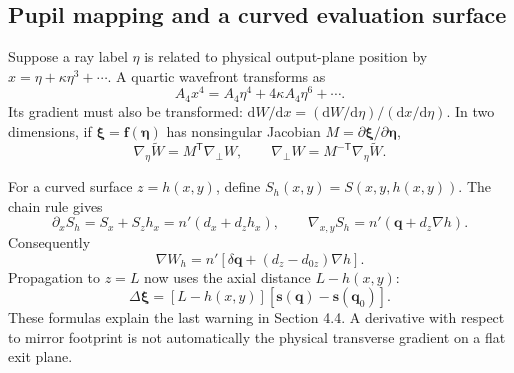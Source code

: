 \documentclass[11pt,a4paper]{article}
\numberwithin{equation}{section}
\newcommand{\dd}{\mathrm{d}}
\newcommand{\gradp}{\nabla_{\!\perp}}
\newcommand{\vct}[1]{\bm{#1}}
\begin{document}
\subsection{Pupil mapping and a curved evaluation surface}
Suppose a ray label $\eta$ is related to physical output-plane position by
$x=\eta+\kappa\eta^3+\cdots$. A quartic wavefront transforms as
\[
 A_4x^4=A_4\eta^4+4\kappa A_4\eta^6+\cdots.
\]
Its gradient must also be transformed:
$\dd W/\dd x=(\dd W/\dd\eta)/(\dd x/\dd\eta)$.
In two dimensions, if $\vct\xi=\vct f(\vct\eta)$ has nonsingular
Jacobian $M=\partial\vct\xi/\partial\vct\eta$,
\[
 \nabla_\eta\widetilde W=M^{\mathsf T}\gradp W,\qquad
 \gradp W=M^{-\mathsf T}\nabla_\eta\widetilde W.
\]

For a curved surface $z=h(x,y)$, define $S_h(x,y)=S(x,y,h(x,y))$.
The chain rule gives
\[
 \partial_x S_h=S_x+S_zh_x=n'(d_x+d_zh_x),
 \qquad
 \nabla_{x,y}S_h=n'(\vct q+d_z\nabla h).
\]
Consequently
\begin{equation}
 \nabla W_h=n'\left[\delta\vct q+(d_z-d_{0z})\nabla h\right].
 \label{eq:curved-gradient}
\end{equation}
Propagation to $z=L$ now uses the axial distance $L-h(x,y)$:
\begin{equation}
 \Delta\vct\xi=[L-h(x,y)]
 [\vct s(\vct q)-\vct s(\vct q_0)].
\end{equation}
These formulas explain the last warning in Section 4.4. A derivative with
respect to mirror footprint is not automatically the physical transverse
gradient on a flat exit plane.
\end{document}
